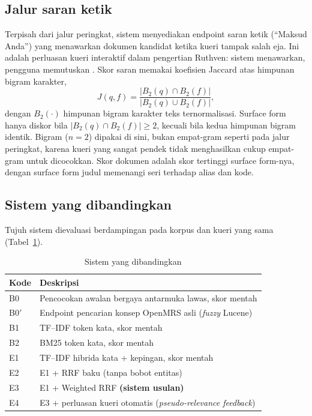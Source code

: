 \documentclass[journal,twoside,web]{ieeecolor}
\begin{document}
\subsection{Jalur saran ketik}

Terpisah dari jalur peringkat, sistem menyediakan endpoint saran ketik
(``Maksud Anda'') yang menawarkan dokumen kandidat ketika kueri tampak salah
eja. Ini adalah perluasan kueri interaktif dalam pengertian Ruthven: sistem
menawarkan, pengguna memutuskan \cite{ruthven2003}. Skor saran memakai koefisien
Jaccard \cite{jaccard1912} atas himpunan bigram karakter,
\begin{equation}
J(q, f) = \frac{|B_2(q) \cap B_2(f)|}{|B_2(q) \cup B_2(f)|},
\label{eq:jaccard}
\end{equation}
dengan $B_2(\cdot)$ himpunan bigram karakter teks ternormalisasi. Surface form
hanya diskor bila $|B_2(q) \cap B_2(f)| \ge 2$, kecuali bila kedua himpunan
bigram identik. Bigram ($n=2$) dipakai di sini, bukan empat-gram seperti pada
jalur peringkat, karena kueri yang sangat pendek tidak menghasilkan cukup
empat-gram untuk dicocokkan. Skor dokumen adalah skor tertinggi surface
form-nya, dengan surface form judul memenangi seri terhadap alias dan kode.

\subsection{Sistem yang dibandingkan}

Tujuh sistem dievaluasi berdampingan pada korpus dan kueri yang sama
(Tabel~\ref{tab:sistem}).

\begin{table}[!t]
\caption{Sistem yang dibandingkan}
\label{tab:sistem}
\centering
\footnotesize
\begin{tabular}{@{}ll@{}}
\toprule
\textbf{Kode} & \textbf{Deskripsi} \\
\midrule
B0  & Pencocokan awalan bergaya antarmuka lawas, skor mentah \\
B0$'$ & Endpoint pencarian konsep OpenMRS asli (\emph{fuzzy} Lucene) \\
B1  & TF--IDF token kata, skor mentah \\
B2  & BM25 token kata, skor mentah \\
E1  & TF--IDF hibrida kata + kepingan, skor mentah \\
E2  & E1 + RRF baku (tanpa bobot entitas) \\
E3  & E1 + Weighted RRF \textbf{(sistem usulan)} \\
E4  & E3 + perluasan kueri otomatis (\emph{pseudo-relevance feedback}) \\
\bottomrule
\end{tabular}
\end{table}
\end{document}
